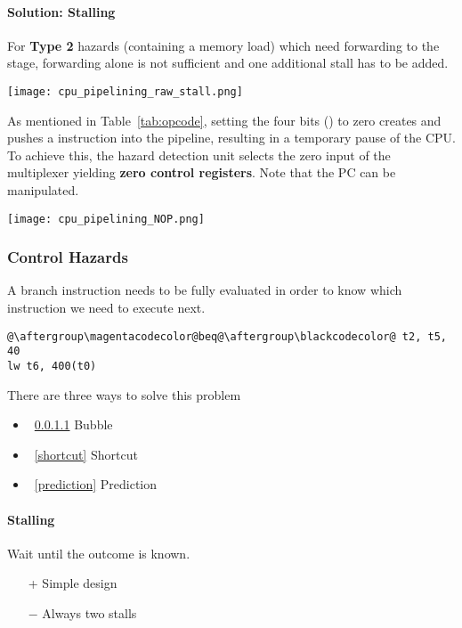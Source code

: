 \paragraph{Solution: Stalling}
For \textbf{Type 2} hazards (containing a memory load) which need forwarding to the  stage, forwarding alone is not sufficient and one additional stall has to be added.

\texttt{[image: cpu\_pipelining\_raw\_stall.png]}

\newpar{}
As mentioned in Table~\ref{tab:opcode}, setting the four bits () to zero creates and pushes a  instruction into the pipeline, resulting in a temporary pause of the CPU. To achieve this, the hazard detection unit selects the zero input of the multiplexer yielding \textbf{zero control registers}. Note that the PC can be manipulated.
\begin{center}
    \texttt{[image: cpu\_pipelining\_NOP.png]}
\end{center}

\subsubsection{Control Hazards}\label{control hazards}

A branch instruction needs to be fully evaluated in order to know which instruction we need to execute next.

\begin{lstlisting}[escapechar=@]
@\aftergroup\magentacodecolor@beq@\aftergroup\blackcodecolor@ t2, t5, 40
lw t6, 400(t0)
\end{lstlisting}

There are three ways to solve this problem
\begin{itemize}
    \item~\ref{contr_stalling} Bubble
    \item~\ref{shortcut} Shortcut
    \item~\ref{prediction} Prediction
\end{itemize}

\paragraph{Stalling}\label{contr_stalling}

Wait until the outcome is known.
\begin{itemize}
    \item[+] Simple design
    \item[$-$] Always two stalls
\end{itemize}

